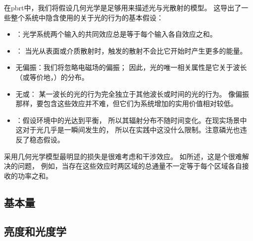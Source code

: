 在pbrt中，我们将假设几何光学是足够用来描述光与光散射的模型。
这导出了一些整个系统中隐含使用的关于光的行为的基本假设：
\begin{itemize}
    \item {}：光学系统两个输入的共同效应总是等于每个输入各自效应之和。
    \item {}：
    当光从表面或介质散射时，触发的散射不会比它开始时产生更多的能量。
    \item {\sffamily 无偏振}：我们将忽略电磁场的偏振；
    因此，光的唯一相关属性是它关于波长（或等价地，）的分布。
    \item {\sffamily 无}或：
    某一波长的光的行为完全独立于其他波长或时间的光的行为。
    像偏振那样，要包含这些效应并不难，但它们为系统增加的实用价值相对较低。
    \item {}：假设环境中的光达到平衡，
    所以其辐射分布不随时间变化。在现实场景中这对于光几乎是一瞬间发生的，
    所以在实践中这没什么限制。注意磷光也违反了稳态假设。
\end{itemize}

采用几何光学模型最明显的损失是很难考虑和干涉效应。
如\citet[p. 24]{PREISENDORFER19653}所述，这是个很难解决的问题，
例如，当存在这些效应时两区域的总通量不一定等于每个区域各自接收的功率之和。

\subsection{基本量}\label{sub:基本量}

\subsection{亮度和光度学}\label{sub:亮度和光度学}